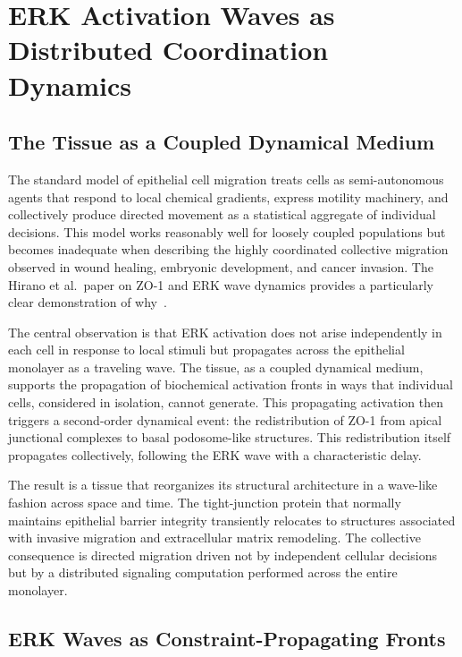\documentclass[11pt,a4paper]{article}
\theoremstyle{plain}
\theoremstyle{definition}
\begin{document}
\section{ERK Activation Waves as Distributed Coordination Dynamics}
\label{sec:erk}

\subsection{The Tissue as a Coupled Dynamical Medium}

The standard model of epithelial cell migration treats cells as semi-autonomous agents
that respond to local chemical gradients, express motility machinery, and collectively
produce directed movement as a statistical aggregate of individual decisions. This model
works reasonably well for loosely coupled populations but becomes inadequate when
describing the highly coordinated collective migration observed in wound healing,
embryonic development, and cancer invasion. The Hirano et al.\ paper on ZO-1 and ERK
wave dynamics provides a particularly clear demonstration of why~\cite{Hirano2026}.

The central observation is that ERK activation does not arise independently in each cell
in response to local stimuli but propagates across the epithelial monolayer as a traveling
wave. The tissue, as a coupled dynamical medium, supports the propagation of biochemical
activation fronts in ways that individual cells, considered in isolation, cannot generate.
This propagating activation then triggers a second-order dynamical event: the redistribution
of ZO-1 from apical junctional complexes to basal podosome-like structures. This
redistribution itself propagates collectively, following the ERK wave with a characteristic
delay.

The result is a tissue that reorganizes its structural architecture in a wave-like fashion
across space and time. The tight-junction protein that normally maintains epithelial
barrier integrity transiently relocates to structures associated with invasive migration
and extracellular matrix remodeling. The collective consequence is directed migration
driven not by independent cellular decisions but by a distributed signaling computation
performed across the entire monolayer.

\subsection{ERK Waves as Constraint-Propagating Fronts}
\end{document}
